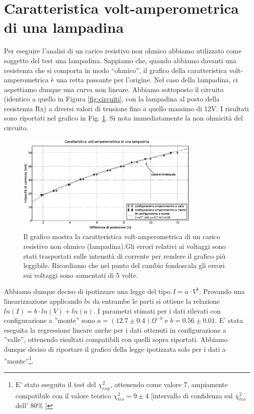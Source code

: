 \section{Caratteristica volt-amperometrica di una lampadina}
Per eseguire l'analisi di un carico resistivo non ohmico abbiamo utilizzato come soggetto del test una lampadina. Sappiamo che, quando abbiamo davanti una resistenza che si comporta in modo ``ohmico'', il grafico della caratteristica volt-amperometrica è una retta passante per l'origine. Nel caso della lampadina, ci aspettiamo dunque una curva non lineare. Abbiamo sottoposto il circuito (identico a quello in Figura \ref{fig:circuiti}, con la lampadina al posto della resistenza Rx) a diversi valori di tensione fino a quello massimo di 12V. I risultati sono riportati nel grafico in Fig. \ref{fig:lampadina}. Si nota immediatamente la non ohmicità del circuito.

\begin{figure}[h]
    \centering
        \includegraphics[width=0.8\textwidth]{lamp.eps}
        \caption{Il grafico mostra la caratteristica volt-amperometrica di un carico resistivo non ohmico (lampadina).Gli errori relativi ai voltaggi sono stati trasportati sulle intensità di corrente per rendere il grafico più leggibile. Ricordiamo che nel punto del cambio fondoscala gli errori sui voltaggi sono aumentati di 5 volte.} 
        \label{fig:lampadina}
\end{figure}


Abbiamo dunque deciso di ipotizzare una legge del tipo $I=a \cdot V^{b}$. Provando una linearizzazione applicando $ln$ da entrambe le parti si ottiene la relazione $ln(I)=b \cdot ln(V) + ln(a)$.  I parametri stimati per i dati rilevati con configurazione a ''monte'' sono $a=(12.7\pm 0.4)\Omega^{-b}$ e $b=0.56 \pm 0.01$. E' stata eseguita la regressione lineare anche per i dati ottenuti in configurazione a ''valle'', ottenendo risultati compatibili con quelli sopra riportati. Abbiamo dunque deciso di riportare il grafico della legge ipotizzata solo per i dati a ''monte''\footnote{E' stato eseguito il test del $\chi ^2_{exp}$, ottenendo come valore 7, ampiamente compatibile con il valore teorico $\chi ^2_{teo}=9 \pm 4$ [intervallo di confidenza sul $\chi ^2_{teo}$ dell' 80\% ] }.

